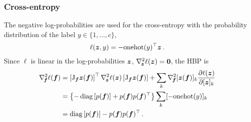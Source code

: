 \subsubsection{Cross-entropy}
The negative log-probabilities are used for the cross-entropy with the
probability distribution of the label $y\in \{1, \dots, c\}$,
\begin{align*}
  \ell({\bm{z}}, y) = - \mathrm{onehot}(y)^\top {\bm{z}}\,.
\end{align*}
Since $\ell$ is linear in the log-probabilities ${\bm{z}}$, \ie
$\nabla_{\!{{\bm{z}}}}^{2}\ell({\bm{z}}) = {\bm{0}}$, the HBP is
\begin{align*}
  \begin{split}
    \nabla_{\!{{\bm{f}}}}^{2}\ell({\bm{f}})
    &=
      \left[\mathrm{J}_{{\bm{f}}} {\bm{z}}({\bm{f}})\right]^\top
      \nabla_{\!{{\bm{z}}}}^{2}\ell({\bm{z}})
      \left[\mathrm{J}_{{\bm{f}}} {\bm{z}}({\bm{f}})\right]
      +
      \sum_k \nabla_{\!{{\bm{f}}}}^{2} [{\bm{z}}({\bm{f}})]_k \frac{\partial \ell({\bm{z}})}{\partial [{\bm{z}}]_k}
    \\
    &=
      \left\{ -\operatorname{diag}\left[p({\bm{f}})\right] + p({\bm{f}}) p({\bm{f}})^\top \right\}
      \sum_k [-\mathrm{onehot}(y)]_k
    \\
    &=
      \operatorname{diag}\left[p({\bm{f}})\right] - p({\bm{f}}) p({\bm{f}})^\top\,.
  \end{split}
\end{align*}

